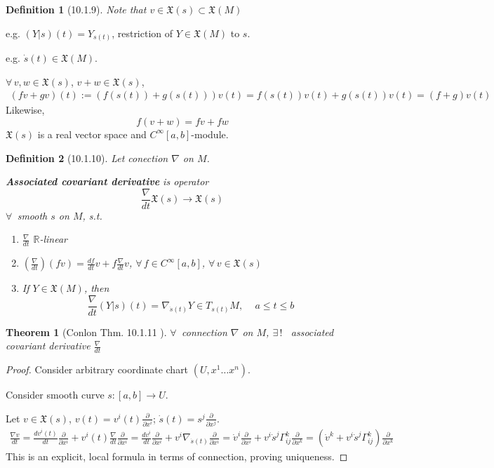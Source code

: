 \documentclass[10pt]{amsart}
\newtheorem{theorem}{Theorem}
\newtheorem{definition}{Definition}
\begin{document}
\begin{multicols*}{2}
\begin{definition}[10.1.9]
Note that $v\in \mathfrak{X}(s) \subset \mathfrak{X}(M)$
\end{definition}

e.g. $(Y|s)(t) = Y_{s(t)}$, restriction of $Y\in \mathfrak{X}(M) $ to $s$.  

e.g. $\dot{s}(t) \in \mathfrak{X}(M)$.  

$\forall \, v,w \in \mathfrak{X}(s)$, $v+w \in \mathfrak{X}(s)$, 
\[
\begin{gathered}
	(fv+gv)(t) := (f(s(t)) + g(s(t)) )v(t) = f(s(t)) v(t) + g(s(t)) v(t) = (f+g)v(t)
\end{gathered}
\]
Likewise, 
\[
f(v+w) = fv+fw
\]
$\mathfrak{X}(s)$ is a real vector space and $C^{\infty}[a,b]$-module.  

\begin{definition}[10.1.10]
Let conection $\nabla$ on $M$.  

\textbf{Associated covariant derivative} is operator 
\[
\frac{\nabla}{dt} \mathfrak{X}(s) \to \mathfrak{X}(s)
\]
$\forall \, $ smooth $s$ on $M$, s.t. 
\begin{enumerate}
\item $\frac{\nabla}{dt}$ $\mathbb{R}$-linear 
\item $\left( \frac{\nabla}{dt} \right)(fv) = \frac{df}{dt} v+ f\frac{\nabla}{dt} v$, $\forall \, f \in C^{\infty}[a,b]$, $\forall \, v\in \mathfrak{X}(s)$  
\item If $Y\in \mathfrak{X}(M)$, then
\[
\frac{\nabla}{dt} (Y|s)(t) = \nabla_{ \dot{s}(t)}Y \in T_{s(t)} M, \quad \, a\leq t \leq b
\]
\end{enumerate}
\end{definition}












\begin{theorem}[Conlon Thm. 10.1.11\cite{Conl2008} ]
	$\forall \, $ connection $\nabla$ on $M$, $\exists \, !$ \, associated covariant derivative $\frac{ \nabla }{dt}$
\end{theorem}

\begin{proof}
	Consider arbitrary coordinate chart $(U,x^1 \dots x^n)$.  
	
	Consider smooth curve $s:[a,b]\to U$.  
	
	Let $v\in \mathfrak{X}(s)$, $v(t) = v^i(t) \frac{ \partial }{ \partial x^i}$; $\dot{s}(t) = s^j \frac{ \partial }{ \partial x^j}$.  
	\[
	\begin{gathered}
	\frac{ \nabla v}{ dt} = \frac{dv^i(t) }{dt}\frac{ \partial }{ \partial x^i} + v^i(t) \frac{ \nabla}{dt} \frac{ \partial }{ \partial x^i} = \frac{ d v^i }{dt}	\frac{ \partial }{ \partial x^i} + v^i \nabla_{ \dot{s}(t) } \frac{ \partial }{ \partial x^i } = \dot{v}^i \frac{ \partial }{ \partial x^i } + v^i\dot{s}^j \Gamma^k_{ij} \frac{ \partial }{ \partial x^k} = \left( \dot{v}^k + v^i \dot{s}^j \Gamma^k_{ij} \right)\frac{ \partial }{ \partial x^k} \end{gathered}
	\]
	This is an explicit, local formula in terms of connection, proving uniqueness.  
	

\end{proof}
\end{multicols*}
\end{document}
